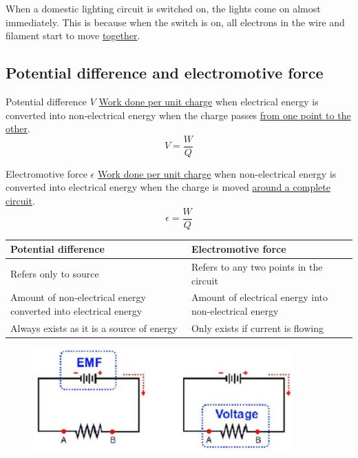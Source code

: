 \begin{remark}
When a domestic lighting circuit is switched on, the lights come on almost immediately. 
This is because when the switch is on, all electrons in the wire and filament start to move \underline{together}.
\end{remark}
\pagebreak

\subsection{Potential difference and electromotive force}
\begin{defn}{Potential difference $V$}{}
\underline{Work done per unit charge} when electrical energy is converted into non-electrical energy when the charge passes \underline{from one point to the other}.
\begin{equation}
V = \frac{W}{Q}
\end{equation}
\end{defn}

\begin{defn}{Electromotive force $\epsilon$}{}
\underline{Work done per unit charge} when non-electrical energy is converted into electrical energy when the charge is moved \underline{around a complete circuit}.
\begin{equation}
\epsilon = \frac{W}{Q}
\end{equation}
\end{defn}

\begin{table}[H]
\centering
\begin{tabular}{|p{7.5cm}|p{7.5cm}|}
\hline
\textbf{Potential difference} & \textbf{Electromotive force} \\
\hline
Refers only to source & Refers to any two points in the circuit \\
Amount of non-electrical energy converted into electrical energy & Amount of electrical energy into non-electrical energy \\
Always exists as it is a source of energy & Only exists if current is flowing \\
\hline
\end{tabular}
\end{table}

\begin{figure}[H]
    \centering
    \includegraphics[width=10cm]{images/pd_emf.png}
\end{figure}
\pagebreak

